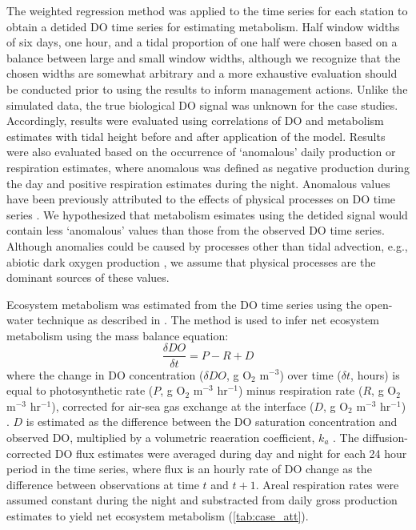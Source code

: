 \documentclass[letterpaper,12pt,oneside]{article}\usepackage[]{graphicx}\usepackage[]{color}
\begin{document}
The weighted regression method was applied to the time series for each station to obtain a detided \ac{DO} time series for estimating metabolism.  Half window widths of six days, one hour, and a tidal proportion of one half were chosen based on a balance between large and small window widths, although we recognize that the chosen widths are somewhat arbitrary and a more exhaustive evaluation should be conducted prior to using the results to inform management actions. Unlike the simulated data, the true biological \ac{DO} signal was unknown for the case studies.  Accordingly, results were evaluated  using correlations of \ac{DO} and metabolism estimates with tidal height before and after application of the model.  Results were also evaluated based on the occurrence of `anomalous' daily production or respiration estimates, where anomalous was defined as negative production during the day and positive respiration estimates during the night.  Anomalous values have been previously attributed to the effects of physical processes on \ac{DO} time series \citep{Caffrey03}.  We hypothesized that metabolism esimates using the detided signal would contain less `anomalous' values than those from the observed \ac{DO} time series.  Although anomalies could be caused by processes other than tidal advection, e.g., abiotic dark oxygen production \citep{Pamatmat97}, we assume that physical processes are the dominant sources of these values.  

Ecosystem metabolism was estimated from the \ac{DO} time series using the open-water technique \citep{Odum56} as described in \citet{Caffrey13}.  The method is used to infer net ecosystem metabolism using the mass balance equation:
\begin{equation} \label{metrate}
\frac{\delta DO}{\delta t} = P - R + D
\end{equation}
where the change in \ac{DO} concentration ($\delta DO$, g O$_2$ m$^{-3}$) over time ($\delta t$, hours) is equal to photosynthetic rate ($P$, g O$_2$ m$^{-3}$ hr$^{-1}$) minus respiration rate ($R$, g O$_2$ m$^{-3}$ hr$^{-1}$), corrected for air-sea gas exchange at the interface ($D$, g O$_2$ m$^{-3}$ hr$^{-1}$) \citep{Caffrey13}. $D$ is estimated as the difference between the \ac{DO} saturation concentration and observed \ac{DO}, multiplied by a volumetric reaeration coefficient, $k_a$ \citep{Thebault08}.  The diffusion-corrected \ac{DO} flux estimates were averaged during day and night for each 24 hour period in the time series, where flux is an hourly rate of \ac{DO} change as the difference between observations at time $t$ and $t+1$.  Areal respiration rates were assumed constant during the night and substracted from daily gross production estimates to yield net ecosystem metabolism (\cref{tab:case_att}).  
\end{document}
